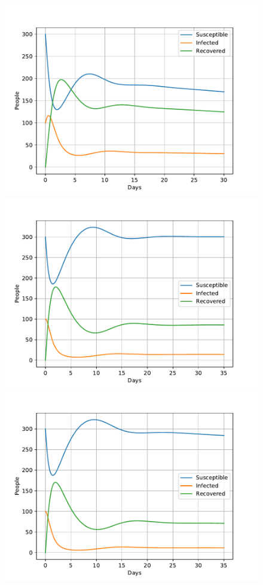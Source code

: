\documentclass[a4paper]{article}
\begin{document}
\begin{figure}[!htb]
	\includegraphics[scale=0.56]{../plots/opp_c_B1.pdf}	
	\includegraphics[scale=0.56]{../plots/opp_c_C0.pdf}
	\includegraphics[scale=0.56]{../plots/opp_c_C1.pdf}

\end{figure}
\end{document}
